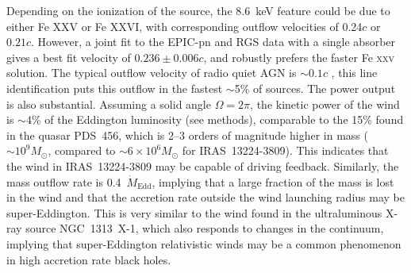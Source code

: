 \documentclass[10pt, a4paper]{article}
\begin{document}
Depending on the ionization of the source, the 8.6~keV feature could be due to either Fe XXV or Fe XXVI, with corresponding outflow velocities of 0.24$c$ or $0.21c$. However, a joint fit to the EPIC-pn and RGS data with a single absorber gives a best fit velocity of $0.236\pm0.006c$, and robustly prefers the faster Fe \textsc{xxv} solution.
The typical outflow velocity of radio quiet AGN is $\sim0.1c$ \cite{Tombesi10}, this line identification puts this outflow in the fastest $\sim$5\% of sources.
The power output is also substantial. Assuming a solid angle $\Omega=2\pi$, the kinetic power of the wind is $\sim4$\% of the Eddington luminosity (see methods), comparable to the 15\% found in the quasar PDS~456\cite{Nardini15}, which is 2--3 orders of magnitude higher in mass ($\sim10^9M_\odot$, compared to $\sim6\times10^6M_\odot$ for IRAS~13224-3809). This indicates that the wind in IRAS~13224-3809 may be capable of driving feedback.
Similarly, the mass outflow rate is 0.4~$\dot{M}_\mathrm{Edd}$, implying that a large fraction of the mass is lost in the wind and that the accretion rate outside the wind launching radius may be super-Eddington. This is very similar to the wind found in the ultraluminous X-ray source NGC~1313~X-1\cite{Pinto16, Walton16}, which also responds to changes in the continuum\cite{Middleton15}, implying that super-Eddington relativistic winds may be a common phenomenon in high accretion rate black holes\cite{Shakura73, King03, Poutanen07}.

\end{document}
